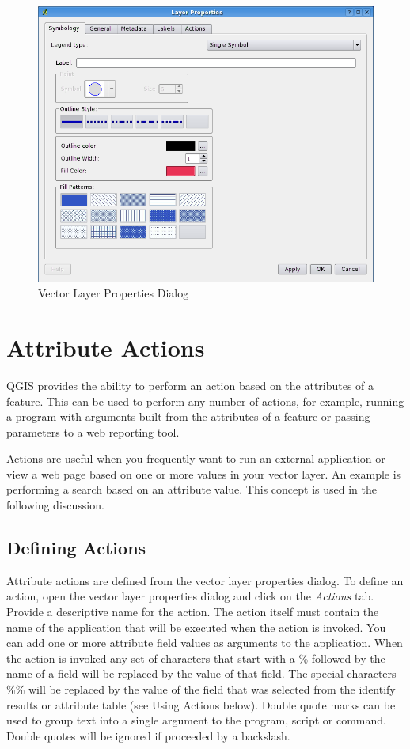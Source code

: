 \begin{figure}[h]
   \begin{center}
   \caption{Vector Layer Properties Dialog}\label{fig:vector_symbology}\smallskip
   \includegraphics[scale=.5]{qgis_user_guide_images/vectorLayerSymbology}  
\end{center}  
\end{figure}
\section{Attribute Actions}
QGIS provides the ability to perform an action based on the attributes of a
feature. This can be used to perform any number of actions, for example,
running a program with arguments built from the attributes of a feature or
passing parameters to a web reporting tool.

Actions are useful when you frequently want to run an external application or
view a web page based on one or more values in your vector layer. An example is
performing a search based on an attribute value. This concept is used in the
following discussion.

\subsection{Defining Actions}
Attribute actions are defined from the vector layer properties dialog. To define
an action, open the vector layer properties dialog and click on the
\textit{Actions} tab. Provide a descriptive name for the action. The action
itself must contain the name of the application that will be executed when the
action is invoked. You can add one or more attribute field values as arguments
to the application. When the action is invoked any set of characters that start
with a \% followed by the name of a field will be replaced by the value of that
field.  The special characters \%\% \index{\%\%}will be replaced by the value of
the field that was selected from the identify results or attribute table (see
Using Actions below).  Double quote marks can be used to group text into a
single argument to the program, script or command. Double quotes will be ignored
if proceeded by a backslash.  

